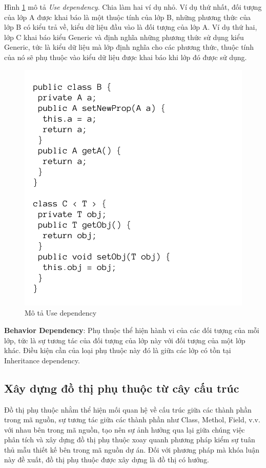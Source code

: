 \documentclass[12pt]{report}
\begin{document}
\noindent Hình \ref{fig:use_dependency} mô tả \textit{Use dependency}. Chia làm hai ví dụ nhỏ. Ví dụ thứ nhất, đối tượng của lớp A được khai báo là một thuộc tính của lớp B, những phương thức của lớp B có kiểu trả về, kiểu dữ liệu đầu vào là đối tượng của lớp A. Ví dụ thứ hai, lớp C khai báo kiểu Generic và định nghĩa những phương thức sử dụng kiểu Generic, tức là kiểu dữ liệu mà lớp định nghĩa cho các phương thức, thuộc tính của nó sẽ phụ thuộc vào kiểu dữ liệu được khai báo khi lớp đó được sử dụng.
\begin{figure}[!htbp]
	\centering
	\includegraphics[scale=0.35]{images/use_dependency}
	\caption{Mô tả Use dependency}
	\label{fig:use_dependency}
\end{figure}

\noindent \textbf{Behavior Dependency}: Phụ thuộc thể hiện hành vi của các đối tượng của mỗi lớp, tức là sự tương tác của đối tượng của lớp này với đối tượng của một lớp khác. Điều kiện cần của loại phụ thuộc này đó là giữa các lớp có tồn tại Inheritance dependency.
\subsection{Xây dựng đồ thị phụ thuộc từ cây cấu trúc}
Đồ thị phụ thuộc nhằm thể hiện mối quan hệ về cấu trúc giữa các thành phần trong mã nguồn, sự tương tác giữa các thành phần như Class, Methol, Field, v.v. với nhau bên trong mã nguồn, tạo nên sự ảnh hưởng qua lại giữa chúng
việc phân tích và xây dựng đồ thị phụ thuộc xoay quanh phương pháp kiểm sự tuân thủ mẫu thiết kế bên trong mã nguồn dự án.
Đối với phương pháp mà khóa luận này đề xuất, đồ thị phụ thuộc được xây dựng là đồ thị có hướng.
\end{document}
